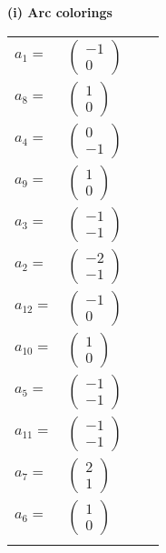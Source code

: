 \documentclass[1p]{elsarticle_modified}
\theoremstyle{definition}
\begin{document}
\flushleft \textbf{(i) Arc colorings}\\
\begin{tabular}{m{7pt} m{180pt} m{7pt} m{180pt} }
\flushright $a_{1}=$&$\begin{pmatrix}-1\\0\end{pmatrix}$ \\
\flushright $a_{8}=$&$\begin{pmatrix}1\\0\end{pmatrix}$ \\
\flushright $a_{4}=$&$\begin{pmatrix}0\\-1\end{pmatrix}$ \\
\flushright $a_{9}=$&$\begin{pmatrix}1\\0\end{pmatrix}$ \\
\flushright $a_{3}=$&$\begin{pmatrix}-1\\-1\end{pmatrix}$ \\
\flushright $a_{2}=$&$\begin{pmatrix}-2\\-1\end{pmatrix}$ \\
\flushright $a_{12}=$&$\begin{pmatrix}-1\\0\end{pmatrix}$ \\
\flushright $a_{10}=$&$\begin{pmatrix}1\\0\end{pmatrix}$ \\
\flushright $a_{5}=$&$\begin{pmatrix}-1\\-1\end{pmatrix}$ \\
\flushright $a_{11}=$&$\begin{pmatrix}-1\\-1\end{pmatrix}$ \\
\flushright $a_{7}=$&$\begin{pmatrix}2\\1\end{pmatrix}$ \\
\flushright $a_{6}=$&$\begin{pmatrix}1\\0\end{pmatrix}$\\&\end{tabular}
\end{document}
